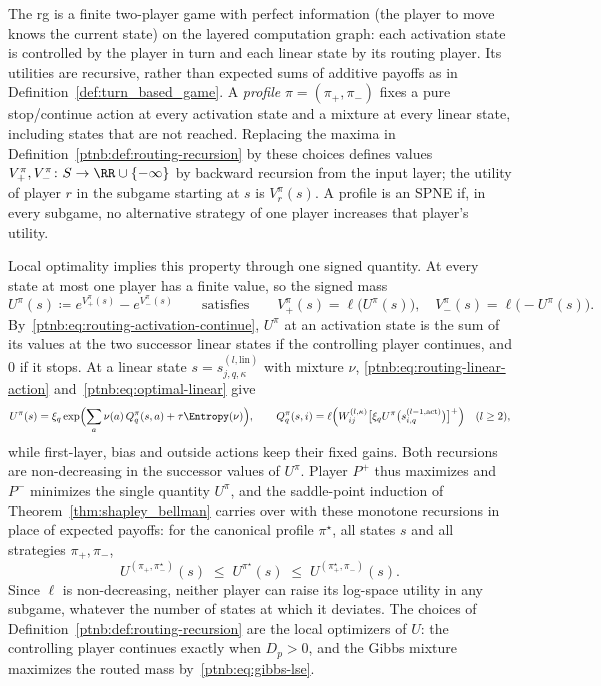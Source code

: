 \begin{remark}\label{ptnb:rem:routing-utilities}
The \ac{rg} is a finite two-player game with perfect information (the player to move knows the current state) on the layered computation graph: each activation state is controlled by the player in turn and each linear state by its routing player. Its utilities are recursive, rather than expected sums of additive payoffs as in Definition~\ref{def:turn_based_game}. A \emph{profile} $\pi=(\pi_+,\pi_-)$ fixes a pure stop/continue action at every activation state and a mixture at every linear state, including states that are not reached. Replacing the maxima in Definition~\ref{ptnb:def:routing-recursion} by these choices defines values $V_+^\pi,V_-^\pi\colon S\to\RR\cup\{-\infty\}$ by backward recursion from the input layer; the utility of player $r$ in the subgame starting at $s$ is $V_r^\pi(s)$. A profile is an SPNE if, in every subgame, no alternative strategy of one player increases that player's utility.

Local optimality implies this property through one signed quantity. At every state at most one player has a finite value, so the signed mass
\[
 U^\pi(s)\coloneqq e^{V_+^\pi(s)}-e^{V_-^\pi(s)}
 \qquad\text{satisfies}\qquad
 V_+^\pi(s)=\ell\bigl(U^\pi(s)\bigr),\quad V_-^\pi(s)=\ell\bigl(-U^\pi(s)\bigr).
\]
By~\eqref{ptnb:eq:routing-activation-continue}, $U^\pi$ at an activation state is the sum of its values at the two successor linear states if the controlling player continues, and $0$ if it stops. At a linear state $s=s_{j,q,\kappa}^{(l,\mathrm{lin})}$ with mixture $\nu$, \eqref{ptnb:eq:routing-linear-action} and~\eqref{ptnb:eq:optimal-linear} give
\[
 U^\pi(s)=\xi_q\exp\Bigl(\sum_a\nu(a)\,Q_q^\pi(s,a)+\tau\Entropy(\nu)\Bigr),
 \qquad
 Q_q^\pi(s,i)=\ell\Bigl(W_{ij}^{(l,\kappa)}\bigl[\xi_qU^\pi\bigl(s_{i,q}^{(l-1,\mathrm{act})}\bigr)\bigr]^+\Bigr)\quad(l\ge2),
\]
while first-layer, bias and outside actions keep their fixed gains. Both recursions are non-decreasing in the successor values of $U^\pi$. Player $P^+$ thus maximizes and $P^-$ minimizes the single quantity $U^\pi$, and the saddle-point induction of Theorem~\ref{thm:shapley_bellman} carries over with these monotone recursions in place of expected payoffs: for the canonical profile $\pi^\star$, all states $s$ and all strategies $\pi_+,\pi_-$,
\[
 U^{(\pi_+,\pi_-^\star)}(s)\;\le\;U^{\pi^\star}(s)\;\le\;U^{(\pi_+^\star,\pi_-)}(s).
\]
Since $\ell$ is non-decreasing, neither player can raise its log-space utility in any subgame, whatever the number of states at which it deviates. The choices of Definition~\ref{ptnb:def:routing-recursion} are the local optimizers of $U$: the controlling player continues exactly when $D_p>0$, and the Gibbs mixture maximizes the routed mass by~\eqref{ptnb:eq:gibbs-lse}.


\end{remark}
